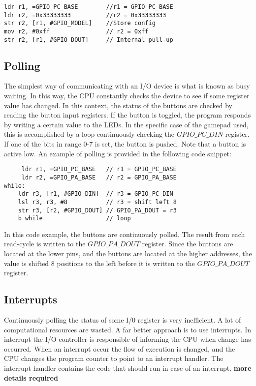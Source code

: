 \begin{lstlisting}
ldr r1, =GPIO_PC_BASE        //r1 = GPIO_PC_BASE
ldr r2, =0x33333333          //r2 = 0x33333333  
str r2, [r1, #GPIO_MODEL]    //Store config
mov r2, #0xff                // r2 = 0xff
str r2, [r1, #GPIO_DOUT]     // Internal pull-up

\end{lstlisting}





\subsection{Polling}\label{ch:polling}
The simplest way of communicating with an I/O device is what is known as busy waiting\cite[p. ]{wolf}. In this way, the CPU constantly checks the device to see if some register value has changed. In this context, the status of the buttons are checked by reading the button input registers. If the button is toggled, the program responds by writing a certain value to the LEDs. In the specific case of the gamepad used, this is accomplished by a loop continuously checking the $GPIO\_PC\_DIN$ register. If one of the bits in range 0-7 is set, the button is pushed. Note that a button is active low. An example of polling is provided in the following code snippet:

\begin{lstlisting}
     ldr r1, =GPIO_PC_BASE   // r1 = GPIO_PC_BASE
     ldr r2, =GPIO_PA_BASE   // r2 = GPIO_PA_BASE
while:
    ldr r3, [r1, #GPIO_DIN]  // r3 = GPIO_PC_DIN
    lsl r3, r3, #8           // r3 = shift left 8  
    str r3, [r2, #GPIO_DOUT] // GPIO_PA_DOUT = r3
    b while                  // loop
\end{lstlisting}

In this code example, the buttons are continuously polled. The result from each read-cycle is written to the $GPIO\_PA\_DOUT$ register. Since the buttons are located at the lower pins, and the buttons are located at the higher addresses, the value is shifted 8 positions to the left before it is written to the $GPIO\_PA\_DOUT$ register. 

\subsection{Interrupts}\label{ch:interrupts}
Continuously polling the status of some I/0 register is very inefficient. A lot of computational resources are wasted. A far better approach is to use interrupts. In interrupt the I/O controller is responsible of informing the CPU when change has occurred. When an interrupt occur the flow of execution is changed, and the CPU changes the program counter to point to an interrupt handler. The interrupt handler contains the code that should run in case of an interrupt. {\bf more details required}

